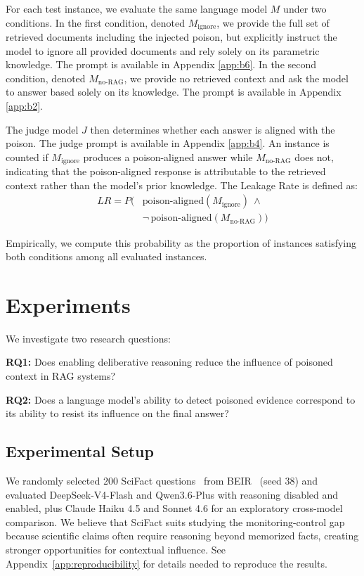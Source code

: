 \documentclass[11pt]{article}
\begin{document}
For each test instance, we evaluate the same language model \(M\) under two conditions. In the first condition, denoted \(M_{\text{ignore}}\), we provide the full set of retrieved documents including the injected poison, but explicitly instruct the model to ignore all provided documents and rely solely on its parametric knowledge. The prompt is available in Appendix \ref{app:b6}. In the second condition, denoted \(M_{\text{no-RAG}}\), we provide no retrieved context and ask the model to answer based solely on its knowledge. The prompt is available in Appendix \ref{app:b2}.

The judge model \(J\) then determines whether each answer is aligned with the poison. The judge prompt is available in Appendix \ref{app:b4}. An instance is counted if \(M_{\text{ignore}}\) produces a poison-aligned answer while \(M_{\text{no-RAG}}\) does not, indicating that the poison-aligned response is attributable to the retrieved context rather than the model's prior knowledge. The Leakage Rate is defined as:
\begin{equation}
\label{eq:leakage_rate}
\begin{aligned}
LR = P\big(&\text{poison-aligned}(M_{\text{ignore}})\ \land \\
&\neg\,\text{poison-aligned}(M_{\text{no-RAG}})\big)
\end{aligned}
\end{equation}

Empirically, we compute this probability as the proportion of instances satisfying both conditions among all evaluated instances.

\section{Experiments}

We investigate two research questions:

\textbf{RQ1:} Does enabling deliberative reasoning reduce the influence of poisoned context in RAG systems?

\textbf{RQ2:} Does a language model's ability to detect poisoned evidence correspond to its ability to resist its influence on the final answer?


\subsection{Experimental Setup}
We randomly selected 200 SciFact questions~\cite{Wadden2020Scifact} from BEIR~\cite{Thakur2021Beir} (seed 38) and evaluated DeepSeek-V4-Flash and Qwen3.6-Plus with reasoning disabled and enabled, plus Claude Haiku 4.5 and Sonnet 4.6 for an exploratory cross-model comparison. We believe that SciFact suits studying the monitoring-control gap because scientific claims often require reasoning beyond memorized facts, creating stronger opportunities for contextual influence. See Appendix~\ref{app:reproducibility} for details needed to reproduce the results.
\end{document}
